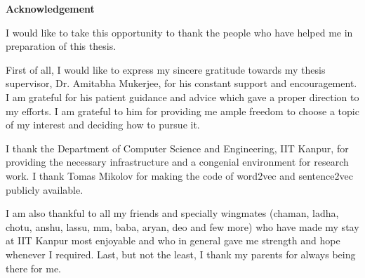 \cleardoublepage

\begin{center}
	{\huge{\textbf{Acknowledgement}}}
\end{center}

I would like to take this opportunity to thank the people who have helped me in preparation of this thesis.

First of all, I would like to express my sincere gratitude towards my thesis supervisor, Dr. Amitabha Mukerjee, for his  constant support and encouragement. I am grateful for his patient guidance and advice which gave a proper direction to my efforts. I am grateful to him for providing me ample freedom to choose a topic of my interest and deciding how to pursue it.

I thank the Department of Computer Science and Engineering, IIT Kanpur, for providing the necessary infrastructure and a congenial environment for research work. I thank Tomas Mikolov for making the code of word2vec and sentence2vec publicly available.

I am also thankful to all my friends and specially wingmates (chaman, ladha, chotu, anshu, lassu, mm, baba, aryan, deo and few more) who have made my stay at IIT Kanpur most enjoyable and who in general gave me strength and hope whenever I required.
Last, but not the least, I thank my parents for always being there for me.

\vskip 4mm
\begin{flushright}
\textit{\textbf{\author}}
\end{flushright}

